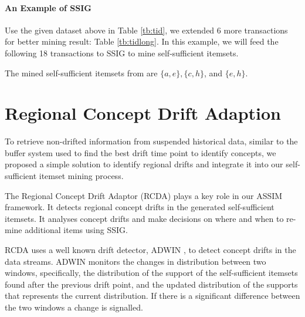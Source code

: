 \paragraph{An Example of SSIG}

Use the given dataset above in Table \ref{tb:tid}, we extended 6 more transactions for better mining result: Table \ref{tb:tidlong}. In this example, we will feed the following 18 transactions to SSIG to mine self-sufficient itemsets.

The mined self-sufficient itemsets from are $\{a, e\}, \{c, h\}$, and $\{e, h\}$.


\section{Regional Concept Drift Adaption}
To retrieve non-drifted information from suspended historical data, similar to the buffer system \cite{buffer} used to find the best drift time point to identify concepts, we proposed a simple solution to identify regional drifts and integrate it into our self-sufficient itemset mining process.

The Regional Concept Drift Adaptor (RCDA) plays a key role in our ASSIM framework. It detects regional concept drifts in the generated self-sufficient itemsets. It analyses concept drifts and make decisions on where and when to re-mine additional items using SSIG.

RCDA uses a well known drift detector, ADWIN \cite{adwin}, to detect concept drifts in the data streams. ADWIN monitors the changes in distribution between two windows, specifically, the distribution of the support of the self-sufficient itemsets found after the previous drift point, and the updated distribution of the supports that represents the current distribution. If there is a significant difference between the two windows a change is signalled. 


